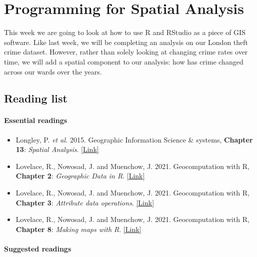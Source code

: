 \documentclass[
]{book}
\providecommand{\tightlist}{%
  \setlength{\itemsep}{0pt}\setlength{\parskip}{0pt}}
\begin{document}
\hypertarget{programming-for-spatial-analysis}{%
\chapter{Programming for Spatial Analysis}\label{programming-for-spatial-analysis}}

This week we are going to look at how to use R and RStudio as a piece of GIS software. Like last week, we will be completing an analysis on our London theft crime dataset. However, rather than solely looking at changing crime rates over time, we will add a spatial component to our analysis: how has crime changed across our wards over the years.

\hypertarget{reading-w05}{%
\section{Reading list}\label{reading-w05}}

\hypertarget{essential-readings-4}{%
\subsubsection*{Essential readings}\label{essential-readings-4}}

\begin{itemize}
\tightlist
\item
  Longley, P. \emph{et al.} 2015. Geographic Information Science \& systems, \textbf{Chapter 13}: \emph{Spatial Analysis}. \href{https://rl.talis.com/3/ucl/items/fd38ec78-2bea-4165-aab3-0e9d9093db8e.html?lang=en-gb\&login=1}{{[}Link{]}}
\item
  Lovelace, R., Nowosad, J. and Muenchow, J. 2021. Geocomputation with R, \textbf{Chapter 2}: \emph{Geographic Data in R}. \href{https://geocompr.robinlovelace.net/spatial-class.html}{{[}Link{]}}
\item
  Lovelace, R., Nowosad, J. and Muenchow, J. 2021. Geocomputation with R, \textbf{Chapter 3}: \emph{Attribute data operations}. \href{https://geocompr.robinlovelace.net/geometric-operations.html}{{[}Link{]}}
\item
  Lovelace, R., Nowosad, J. and Muenchow, J. 2021. Geocomputation with R, \textbf{Chapter 8}: \emph{Making maps with R}. \href{https://geocompr.robinlovelace.net/adv-map.html}{{[}Link{]}}
\end{itemize}

\hypertarget{suggested-readings-4}{%
\subsubsection*{Suggested readings}\label{suggested-readings-4}}
\end{document}
